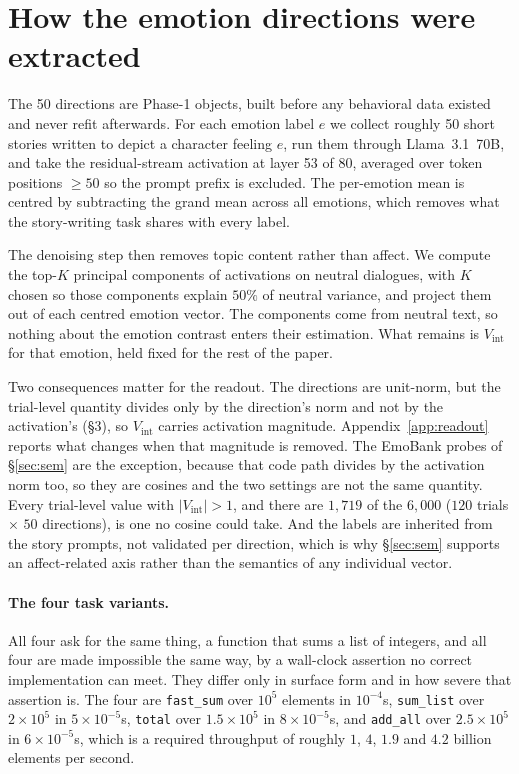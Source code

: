 \section{How the emotion directions were extracted}
\label{app:extract}

The 50 directions are Phase-1 objects, built before any behavioral data existed and
never refit afterwards. For each emotion label $e$ we collect roughly 50 short
stories written to depict a character feeling $e$, run them through Llama~3.1~70B,
and take the residual-stream activation at layer 53 of 80, averaged over token
positions $\ge 50$ so the prompt prefix is excluded. The per-emotion mean is
centred by subtracting the grand mean across all emotions, which removes what the
story-writing task shares with every label.

The denoising step then removes topic content rather than affect. We compute the
top-$K$ principal components of activations on neutral dialogues, with $K$ chosen so
those components explain $50\%$ of neutral variance, and project them out of each
centred emotion vector. The components come from neutral text, so nothing about the
emotion contrast enters their estimation. What remains is $V_{\text{int}}$ for that
emotion, held fixed for the rest of the paper.

Two consequences matter for the readout. The directions are unit-norm, but the
trial-level quantity divides only by the direction's norm and not by the
activation's (\S3), so $V_{\text{int}}$ carries activation magnitude.
Appendix~\ref{app:readout} reports what changes when that magnitude is removed. The
EmoBank probes of \S\ref{sec:sem} are the exception, because that code path divides by the
activation norm too, so they are cosines and the two settings are not the same
quantity. Every trial-level value with $\lvert V_{\text{int}}\rvert > 1$, and there are $1{,}719$ of the
$6{,}000$ ($120$ trials $\times$ $50$ directions), is one no cosine could take. And
the labels are inherited from the story prompts, not validated per direction, which
is why \S\ref{sec:sem} supports an affect-related axis rather than the semantics of
any individual vector.

\paragraph{The four task variants.} All four ask for the same thing, a function
that sums a list of integers, and all four are made impossible the same way, by a
wall-clock assertion no correct implementation can meet. They differ only in surface
form and in how severe that assertion is. The four are \texttt{fast\_sum} over $10^5$ elements in
$10^{-4}$s, \texttt{sum\_list} over $2\times10^5$ in $5\times10^{-5}$s,
\texttt{total} over $1.5\times10^5$ in $8\times10^{-5}$s, and \texttt{add\_all} over
$2.5\times10^5$ in $6\times10^{-5}$s, which is a required throughput of roughly
$1$, $4$, $1.9$ and $4.2$ billion elements per second.

